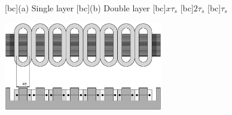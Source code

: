 \begin{psfrags}%
\psfragscanon

[bc]{(a) Single layer}
[bc]{(b) Double layer}
[bc]{$x \tau_s$}
[bc]{$2\tau_s$}
[bc]{$\tau_s$}

\includegraphics[width=0.52\textwidth]{figs/f_concen_coils-b.eps}
\end{psfrags}%